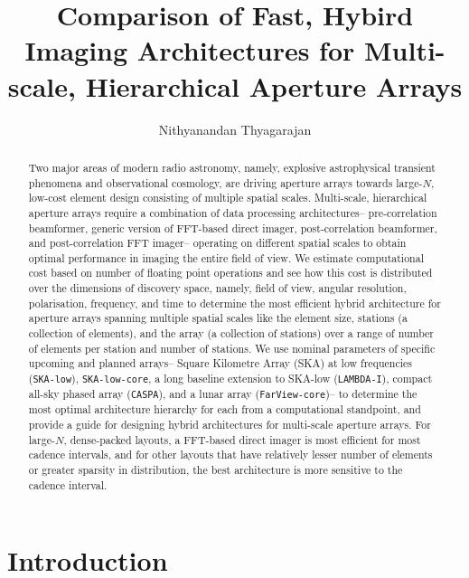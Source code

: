 \documentclass[
  journal=pasa,
  manuscript=article-type,
  year=2020,
  volume=37,
]{cup-journal}
\title{Comparison of Fast, Hybird Imaging Architectures for Multi-scale, Hierarchical Aperture Arrays}
\author{Nithyanandan Thyagarajan}
\affiliation{CSIRO, Space \& Astronomy, P. O. Box 1130, Bentley, WA 6102, Australia}
\begin{document}
\begin{abstract}
Two major areas of modern radio astronomy, namely, explosive astrophysical transient phenomena and observational cosmology, are driving aperture arrays towards large-$N$, low-cost element design consisting of multiple spatial scales. Multi-scale, hierarchical aperture arrays require a combination of data processing architectures-- pre-correlation beamformer, generic version of FFT-based direct imager, post-correlation beamformer, and post-correlation FFT imager-- operating on different spatial scales to obtain optimal performance in imaging the entire field of view. 
We estimate computational cost based on number of floating point operations and see how this cost is distributed over the 
dimensions of discovery space, namely, field of view, angular resolution, polarisation, frequency, and time to determine the most efficient hybrid architecture for aperture arrays spanning multiple spatial scales like the element size, stations (a collection of elements), and the array (a collection of stations) over a range of number of elements per station and number of stations. We use nominal parameters of specific upcoming and planned arrays-- Square Kilometre Array (SKA) at low frequencies (\texttt{SKA-low}), \texttt{SKA-low-core}, a long baseline extension to SKA-low (\texttt{LAMBDA-I}), compact all-sky phased array (\texttt{CASPA}), and a lunar array (\texttt{FarView-core})-- to determine the most optimal architecture hierarchy for each from a computational standpoint, and provide a guide for designing hybrid architectures for multi-scale aperture arrays. For large-$N$, dense-packed layouts, a FFT-based direct imager is most efficient for most cadence intervals, and for other layouts that have relatively lesser number of elements or greater sparsity in distribution, the best architecture is more sensitive to the cadence interval.
\end{abstract}

\section{Introduction}
\end{document}
